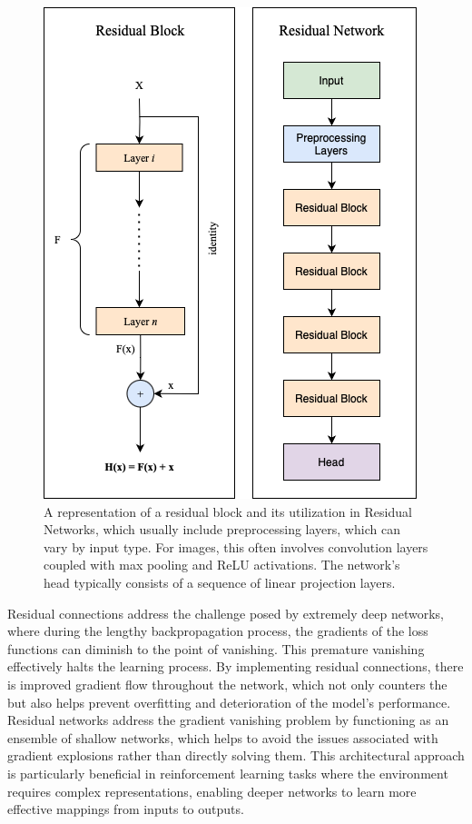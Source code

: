         \bigskip
        
        \begin{figure}[htbp]
            \centering
            \includegraphics[width=0.45\linewidth]{images/methods_mono/residuals/residual_net.png}
            \captionsetup{justification=justified, singlelinecheck=false, width=1\linewidth, labelfont=bf} 
            \caption[]{A representation of a residual block and its utilization in Residual Networks, which usually include preprocessing layers, which can vary by input type. For images, this often involves convolution layers coupled with max pooling and ReLU activations. The network's head typically consists of a sequence of linear projection layers.}
            \label{fig:residual-net}
        \end{figure}
        
        
        \noindent Residual connections address the challenge posed by extremely deep networks, where during the lengthy backpropagation process, the gradients of the loss functions can diminish to the point of vanishing. This premature vanishing effectively halts the learning process. By implementing residual connections, there is improved gradient flow throughout the network, which not only counters the but also helps prevent overfitting and deterioration of the model's performance. Residual networks address the gradient vanishing problem by functioning as an ensemble of shallow networks, which helps to avoid the issues associated with gradient explosions rather than directly solving them. This architectural approach is particularly beneficial in reinforcement learning tasks where the environment requires complex representations, enabling deeper networks to learn more effective mappings from inputs to outputs.

